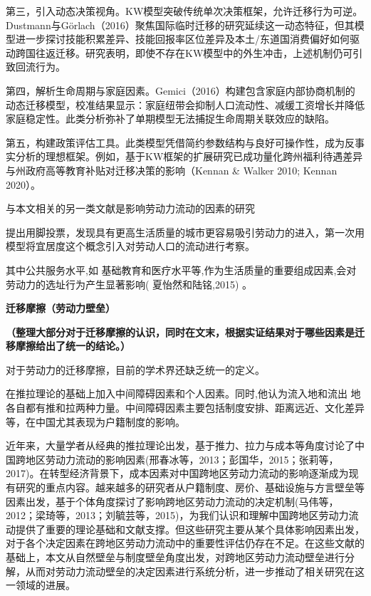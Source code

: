 \documentclass[a4paper,12pt]{article}
\begin{document}
第三，引入动态决策视角。KW模型突破传统单次决策框架，允许迁移行为可逆。Dustmann与Görlach（2016）聚焦国际临时迁移的研究延续这一动态特征，但其模型进一步探讨技能积累差异、技能回报率区位差异及本土/东道国消费偏好如何驱动跨国往返迁移。研究表明，即使不存在KW模型中的外生冲击，上述机制仍可引致回流行为。

第四，解析生命周期与家庭因素。Gemici（2016）构建包含家庭内部协商机制的动态迁移模型，校准结果显示：家庭纽带会抑制人口流动性、减缓工资增长并降低家庭稳定性。此类分析弥补了单期模型无法捕捉生命周期关联效应的缺陷。

第五，构建政策评估工具。此类模型凭借简约参数结构与良好可操作性，成为反事实分析的理想框架。例如，基于KW框架的扩展研究已成功量化跨州福利待遇差异与州政府高等教育补贴对迁移决策的影响（Kennan \& Walker 2010; Kennan 2020）。















与本文相关的另一类文献是影响劳动力流动的因素的研究

\cite{tieboutPureTheoryLocal1956}提出用脚投票，发现具有更高生活质量的城市更容易吸引劳动力的进入，第一次用模型将宜居度这个概念引入对劳动人口的流动进行考察。

其中公共服务水平,如 基础教育和医疗水平等,作为生活质量的重要组成因素,会对劳动力的选址行为产生显著影响( 夏怡然和陆铭,2015) 。

\textbf{迁移摩擦（劳动力壁垒）}

\textbf{（整理大部分对于迁移摩擦的认识，同时在文末，根据实证结果对于哪些因素是迁移摩擦给出了统一的结论。）}

对于劳动力的迁移摩擦，目前的学术界还缺乏统一的定义。

\cite{leeTheoryMigration1966}在推拉理论的基础上加入中间障碍因素和个人因素。同时,他认为流入地和流出  地各自都有推和拉两种力量。中间障碍因素主要包括制度安排、距离远近、文化差异等，在中国尤其表现为户籍制度的影响。

近年来，大量学者从经典的推拉理论出发，基于推力、拉力与成本等角度讨论了中国跨地区劳动力流动的影响因素(邢春冰等，2013；彭国华，2015；张莉等，2017)。在转型经济背景下，成本因素对中国跨地区劳动力流动的影响逐渐成为现有研究的重点内容。越来越多的研究者从户籍制度、房价、基础设施与方言壁垒等因素出发，基于个体角度探讨了影响跨地区劳动力流动的决定机制(马伟等，2012；梁琦等，2013；刘毓芸等，2015)，为我们认识和理解中国跨地区劳动力流动提供了重要的理论基础和文献支撑。但这些研究主要从某个具体影响因素出发，对于各个决定因素在跨地区劳动力流动中的重要性评估仍存在不足。在这些文献的基础上，本文从自然壁垒与制度壁垒角度出发，对跨地区劳动力流动壁垒进行分解，从而对劳动力流动壁垒的决定因素进行系统分析，进一步推动了相关研究在这一领域的进展。
\end{document}

